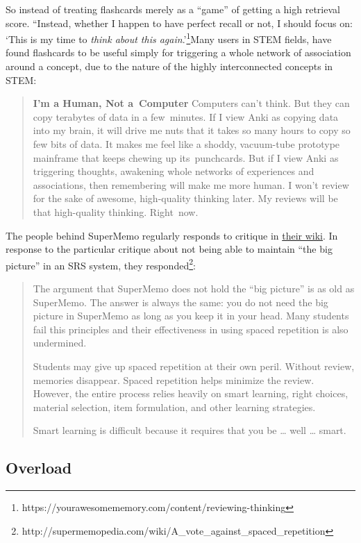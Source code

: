 So instead of treating flashcards merely as a ``game'' of getting a high
retrieval score. ``Instead, whether I happen to have perfect recall or
not, I should focus on: `This is my time to \emph{think about this
again}.'\footnote{https://yourawesomememory.com/content/reviewing-thinking}Many
users in STEM fields, have found flashcards to be useful simply for
triggering a whole network of association around a concept, due to the
nature of the highly interconnected concepts in STEM:

\begin{quote}
\textbf{I'm a Human, Not a~Computer} Computers can't think. But they can
copy terabytes of data in a few~minutes. If I view Anki as copying data
into my brain, it will drive me nuts that it takes so many hours to copy
so few bits of data. It makes me feel like a shoddy, vacuum-tube
prototype mainframe that keeps chewing up its~punchcards. But if I view
Anki as triggering thoughts, awakening whole networks of experiences and
associations, then remembering will make me more human. I won't review
for the sake of awesome, high-quality thinking later. My reviews will be
that high-quality thinking. Right~now.
\end{quote}

The people behind SuperMemo regularly responds to critique in
\href{http://supermemopedia.com}{their wiki}. In response to the
particular critique about not being able to maintain ``the big picture''
in an SRS system, they responded\footnote{http://supermemopedia.com/wiki/A\_vote\_against\_spaced\_repetition}:

\begin{quote}
The argument that SuperMemo does not hold the ``big picture'' is as old
as SuperMemo. The answer is always the same: you do not need the big
picture in SuperMemo as long as you keep it in your head. Many students
fail this principles and their effectiveness in using spaced repetition
is also undermined.

Students may give up spaced repetition at their own peril. Without
review, memories disappear. Spaced repetition helps minimize the review.
However, the entire process relies heavily on smart learning, right
choices, material selection, item formulation, and other learning
strategies.

Smart learning is difficult because it requires that you be \ldots{}
well \ldots{} smart.
\end{quote}

\subsection{Overload}\label{overload}

